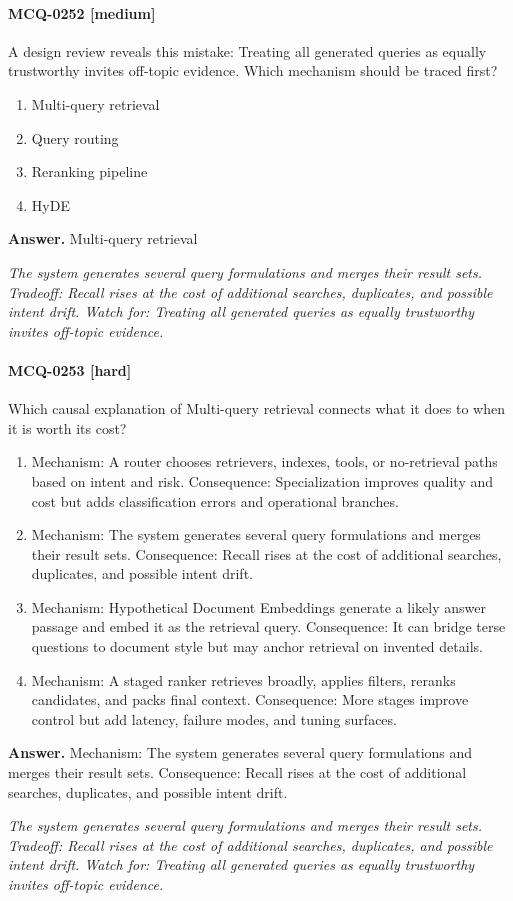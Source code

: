 \paragraph{MCQ-0252 [medium]} A design review reveals this mistake: Treating all generated queries as equally trustworthy invites off-topic evidence. Which mechanism should be traced first?
\begin{enumerate}[label=\Alph*.]
\item Multi-query retrieval
\item Query routing
\item Reranking pipeline
\item HyDE
\end{enumerate}
\noindent\textbf{Answer.} Multi-query retrieval
\par\textit{The system generates several query formulations and merges their result sets. Tradeoff: Recall rises at the cost of additional searches, duplicates, and possible intent drift. Watch for: Treating all generated queries as equally trustworthy invites off-topic evidence.}
\paragraph{MCQ-0253 [hard]} Which causal explanation of Multi-query retrieval connects what it does to when it is worth its cost?
\begin{enumerate}[label=\Alph*.]
\item Mechanism: A router chooses retrievers, indexes, tools, or no-retrieval paths based on intent and risk. Consequence: Specialization improves quality and cost but adds classification errors and operational branches.
\item Mechanism: The system generates several query formulations and merges their result sets. Consequence: Recall rises at the cost of additional searches, duplicates, and possible intent drift.
\item Mechanism: Hypothetical Document Embeddings generate a likely answer passage and embed it as the retrieval query. Consequence: It can bridge terse questions to document style but may anchor retrieval on invented details.
\item Mechanism: A staged ranker retrieves broadly, applies filters, reranks candidates, and packs final context. Consequence: More stages improve control but add latency, failure modes, and tuning surfaces.
\end{enumerate}
\noindent\textbf{Answer.} Mechanism: The system generates several query formulations and merges their result sets. Consequence: Recall rises at the cost of additional searches, duplicates, and possible intent drift.
\par\textit{The system generates several query formulations and merges their result sets. Tradeoff: Recall rises at the cost of additional searches, duplicates, and possible intent drift. Watch for: Treating all generated queries as equally trustworthy invites off-topic evidence.}
